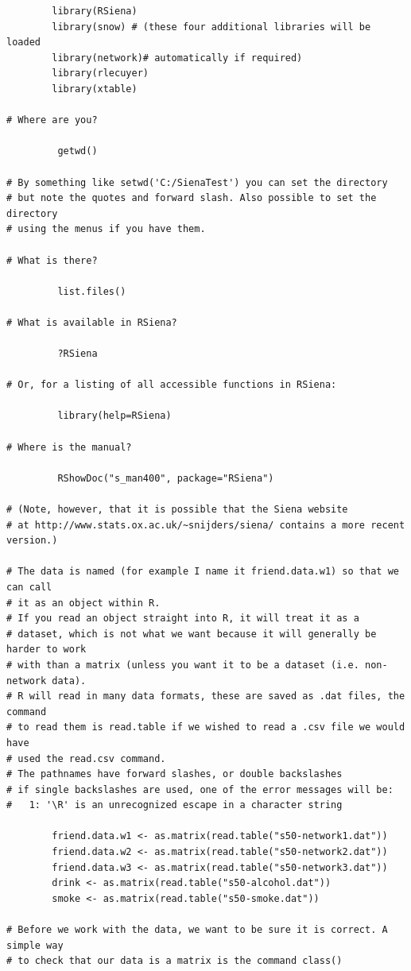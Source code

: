 \documentclass[a4paper,fleqn]{article}
\newcommand{\+}{\, + \,}
\newcommand{\R}{{\sf R }}
\begin{document}
{\begin{verbatim}
        library(RSiena)
        library(snow) # (these four additional libraries will be loaded
        library(network)# automatically if required)
        library(rlecuyer)
        library(xtable)

# Where are you?

         getwd()

# By something like setwd('C:/SienaTest') you can set the directory
# but note the quotes and forward slash. Also possible to set the directory
# using the menus if you have them.

# What is there?

         list.files()

# What is available in RSiena?

         ?RSiena

# Or, for a listing of all accessible functions in RSiena:

         library(help=RSiena)

# Where is the manual?

         RShowDoc("s_man400", package="RSiena")

# (Note, however, that it is possible that the Siena website
# at http://www.stats.ox.ac.uk/~snijders/siena/ contains a more recent version.)

# The data is named (for example I name it friend.data.w1) so that we can call
# it as an object within R.
# If you read an object straight into R, it will treat it as a
# dataset, which is not what we want because it will generally be harder to work
# with than a matrix (unless you want it to be a dataset (i.e. non-network data).
# R will read in many data formats, these are saved as .dat files, the command
# to read them is read.table if we wished to read a .csv file we would have
# used the read.csv command.
# The pathnames have forward slashes, or double backslashes
# if single backslashes are used, one of the error messages will be:
#   1: '\R' is an unrecognized escape in a character string

        friend.data.w1 <- as.matrix(read.table("s50-network1.dat"))
        friend.data.w2 <- as.matrix(read.table("s50-network2.dat"))
        friend.data.w3 <- as.matrix(read.table("s50-network3.dat"))
        drink <- as.matrix(read.table("s50-alcohol.dat"))
        smoke <- as.matrix(read.table("s50-smoke.dat"))

# Before we work with the data, we want to be sure it is correct. A simple way
# to check that our data is a matrix is the command class()


\end{verbatim}}
\end{document}
